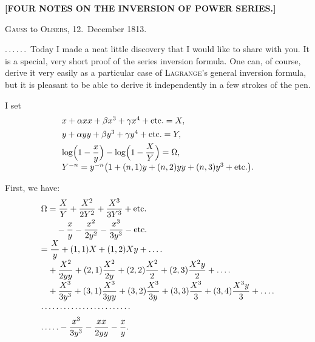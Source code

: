 \clearpage
{}
\begin{center}
\textbf{[FOUR NOTES ON THE INVERSION OF POWER SERIES.]}
\end{center}



\begin{center}
\textsc{Gauss} to \textsc{Olbers}, 12.\ December 1813.
\end{center}

\noindent\hspace*{\parindent}.\,.\,.\,.\,.\,.\ Today I made a neat little discovery that I would like
to share with you. It is a special, very short proof of the series inversion formula. One can, of course,
derive it very easily as a particular case of \textsc{Lagrange}'s general inversion formula,
but it is pleasant to be able to derive it independently
in a few strokes of the pen.

\noindent\hspace*{\parindent}I set
\[
\begin{array}{l}
x+\alpha xx+\beta x^3+\gamma x^4+\text{etc.}=X,\\[4pt]
y+\alpha yy+\beta y^3+\gamma y^4+\text{etc.}=Y,\\[4pt]
\log\Bigl(1-\dfrac{x}{y}\Bigr)-\log\Bigl(1-\dfrac{X}{Y}\Bigr)=\Omega,\\[4pt]
Y^{-n}=y^{-n}\bigl(1+(n,1)y+(n,2)yy+(n,3)y^3+\text{etc.}\bigr).
\end{array}
\]

\noindent First, we have:
\[
\begin{array}{l}
\Omega=\dfrac{X}{Y}+\dfrac{X^2}{2Y^2}+\dfrac{X^3}{3Y^3}+\text{etc.}\\[6pt]
\hphantom{\Omega=}-\dfrac{x}{y}-\dfrac{x^2}{2y^2}-\dfrac{x^3}{3y^3}-\text{etc.}\\[6pt]
=\dfrac{X}{y}+(1,1)X+(1,2)Xy+.\,.\,.\,.\\[6pt]
\hphantom{=}+\dfrac{X^2}{2yy}+(2,1)\dfrac{X^2}{2y}+(2,2)\dfrac{X^2}{2}+(2,3)\dfrac{X^2y}{2}+.\,.\,.\,.\\[6pt]
\hphantom{=}+\dfrac{X^3}{3y^3}+(3,1)\dfrac{X^3}{3yy}+(3,2)\dfrac{X^3}{3y}+(3,3)\dfrac{X^3}{3}+(3,4)\dfrac{X^3y}{3}+.\,.\,.\,.\\[6pt]
.\,.\,.\,.\,.\,.\,.\,.\,.\,.\,.\,.\,.\,.\,.\,.\,.\,.\,.\,.\,.\,.\,.\,.\\[6pt]
.\,.\,.\,.\,.-\dfrac{x^3}{3y^3}-\dfrac{xx}{2yy}-\dfrac{x}{y}.
\end{array}
\]


